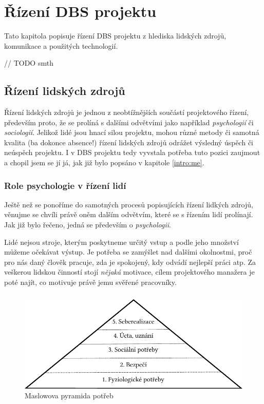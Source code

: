 \chapter{Řízení DBS projektu} \label{DBSmanagement}

Tato kapitola popisuje řízení DBS projektu z hlediska lidských zdrojů, komunikace a použitých technologií.

// TODO smth

\section{Řízení lidských zdrojů}

Řízení lidských zdrojů je jednou z neobtížnějších součástí projektového řízení, především proto, že se prolíná s dalšími odvětvími jako například \emph{psychologií} či \emph{sociologií}. Jelikož lidé jsou hnací silou projektu, mohou různé metody či samotná kvalita (ba dokonce absence!) řízení lidských zdrojů odrážet výsledný úspěch či neúspěch projektu. I v DBS projektu tedy vyvstala potřeba tuto pozici zaujmout a chopil jsem se jí já, jak již bylo popsáno v kapitole \ref{intro:me}.

\subsection{Role psychologie v řízení lidí}
Ještě než se ponoříme do samotných procesů popisujících řízení lidkých zdrojů, věnujme se chvíli právě oněm dalším odvětvím, které se s řízením lidí prolínají. Jak již bylo řečeno, jedná se především o \emph{psychologii}.

Lidé nejsou stroje, kterým poskytneme určitý vstup a podle jeho množství můžeme očekávat výstup. Je potřeba se zamýšlet nad dalšími okolnostmi, proč pro nás daný člověk pracuje, zda je spokojený, kdy odvádí nejlepší práci atp. Za veškerou lidskou činností stojí \emph{nějaká} motivace, cílem projektového manažera je poté najít, co motivuje právě jemu svěřené pracovníky.

\paragraph{}
\begin{figure}[h]
	\includegraphics{../pdf/maslow.pdf}
	\caption{Maslowova pyramida potřeb} \label{picture:maslow}
\end{figure}

